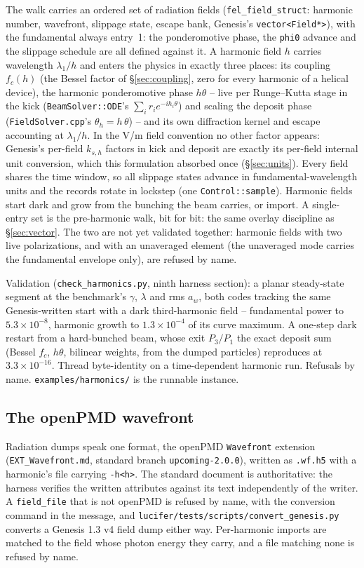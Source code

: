 \documentclass[11pt]{article}
\newcommand{\code}[1]{\texttt{#1}}
\begin{document}
The walk carries an ordered set of radiation fields (\code{fel\_field\_struct}:
harmonic number, wavefront, slippage state, escape bank, Genesis's
\code{vector<Field*>}), with the fundamental always entry~1: the ponderomotive
phase, the \code{phi0} advance and the slippage schedule are all defined against it.
A harmonic field $h$ carries wavelength $\lambda_1/h$ and enters the physics in
exactly three places: its coupling $f_c(h)$ (the Bessel factor of
\S\ref{sec:coupling}, zero for every harmonic of a helical device), the harmonic
ponderomotive phase $h\theta$ -- live per Runge--Kutta stage in the kick
(\code{BeamSolver::ODE}'s $\sum_i r_i e^{-ih_i\theta}$) and scaling the deposit
phase (\code{FieldSolver.cpp}'s $\theta_h = h\,\theta$) -- and its own diffraction
kernel and escape accounting at $\lambda_1/h$. In the V/m field
convention no other factor appears: Genesis's per-field $k_{s,h}$ factors in kick
and deposit are exactly its per-field internal unit conversion, which this
formulation absorbed once (\S\ref{sec:units}). Every field shares the time window,
so all slippage states advance in fundamental-wavelength units and the records
rotate in lockstep (one \code{Control::sample}). Harmonic fields start dark and
grow from the bunching the beam carries, or import. A single-entry set is the
pre-harmonic walk, bit for bit: the same overlay discipline as
\S\ref{sec:vector}. The two are not yet validated together: harmonic fields
with two live polarizations, and with an unaveraged element (the unaveraged mode
carries the fundamental envelope only), are refused by name.

Validation (\code{check\_harmonics.py}, ninth harness section): a planar
steady-state segment at the benchmark's $\gamma$, $\lambda$ and rms $a_w$, both
codes tracking the same Genesis-written start with a dark third-harmonic field --
fundamental power to $5.3\times10^{-8}$, harmonic growth to $1.3\times10^{-4}$ of
its curve maximum. A one-step dark restart from a hard-bunched beam, whose exit
$P_3/P_1$ the exact deposit sum (Bessel $f_c$, $h\theta$, bilinear weights, from
the dumped particles) reproduces at $3.3\times10^{-16}$. Thread byte-identity on a
time-dependent harmonic run. Refusals by name. \code{examples/harmonics/} is the
runnable instance.

\subsection{The openPMD wavefront}\label{sec:openpmd}

Radiation dumps speak one format, the openPMD \code{Wavefront} extension
(\code{EXT\_Wavefront.md}, standard branch \code{upcoming-2.0.0}), written as
\code{.wf.h5} with a harmonic's file carrying \code{-h<h>}. The standard document is
authoritative: the harness verifies the written attributes against its text
independently of the writer. A \code{field\_file} that is not openPMD is refused by
name, with the conversion command in the message, and
\code{lucifer/tests/scripts/convert\_genesis.py} converts a Genesis 1.3 v4 field dump
either way. Per-harmonic imports are matched to the field whose photon energy they
carry, and a file matching none is refused by name.
\end{document}
